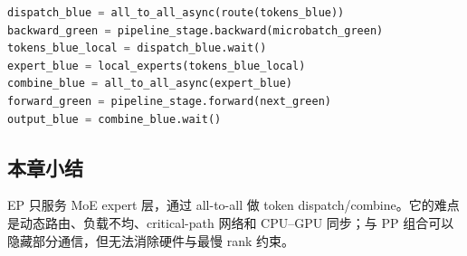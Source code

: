 
\begin{lstlisting}[language=Python,caption={EP 通信与另一 micro-batch 计算重叠的概念调度}]
dispatch_blue = all_to_all_async(route(tokens_blue))
backward_green = pipeline_stage.backward(microbatch_green)
tokens_blue_local = dispatch_blue.wait()
expert_blue = local_experts(tokens_blue_local)
combine_blue = all_to_all_async(expert_blue)
forward_green = pipeline_stage.forward(next_green)
output_blue = combine_blue.wait()
\end{lstlisting}


\subsection{本章小结}

EP 只服务 MoE expert 层，通过 all-to-all 做 token dispatch/combine。它的难点是动态路由、负载不均、critical-path 网络和 CPU--GPU 同步；与 PP 组合可以隐藏部分通信，但无法消除硬件与最慢 rank 约束。

